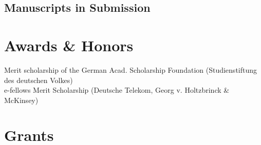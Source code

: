 \documentclass[11pt]{article} %
\begin{document}
\subsection*{Manuscripts in Submission}


\section*{Awards \& Honors}

Merit scholarship of the German Acad. Scholarship Foundation (Studienstiftung des deutschen Volkes)\\
e-fellows Merit Scholarship (Deutsche Telekom, Georg v. Holtzbrinck \& McKinsey)

\section*{Grants}
\end{document}
